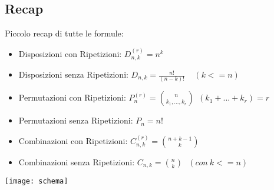 \newpage

\subsection{Recap}
Piccolo recap di tutte le formule:
\begin{itemize}
\item Disposizioni con Ripetizioni: $D^{(r)}_{n,k} = n^k$
\item Disposizioni senza Ripetizioni: $ D_{n,k} = \frac{n!}{(n-k)!} \: \: \: \: \: (k<=n) $
\item Permutazioni con Ripetizioni: $P^{(r)}_n = \binom{n}{k_1,...,k_r} \: \: (k_1+...+k_r)=r$
\item Permutazioni senza Ripetizioni: $P_n = n!$
\item Combinazioni con Ripetizioni: $ C_{n,k}^{(r)} = \binom{n+k-1}{k} $
\item Combinazioni senza Ripetizioni: $ C_{n,k} = \binom{n}{k} \: \: \: (con\:k<=n) $
\end{itemize}
\begin{center}
\texttt{[image: schema]}
\end{center}
%


